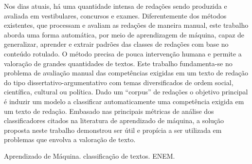 \begin{resumo} 
  Nos dias atuais, há uma quantidade intensa de redações sendo produzida e 
  avaliada em vestibulares, concursos e exames. Diferentemente dos métodos 
  existentes, que processam e avaliam as redações de maneira manual, este 
  trabalho aborda uma forma automática, por meio de  aprendizagem de máquina, 
  capaz de generalizar, aprender e extrair padrões das classes de redações com 
  base no conteúdo rotulado. O método precisa de pouca intervenção humana e 
  permite a valoração de grandes quantidades de textos.  Este trabalho 
  fundamenta-se no problema de avaliação manual das competências exigidas em um 
  texto de redação do tipo dissertativo-argumentativo com temas diversificados 
  de ordem social, científica, cultural ou política. Dado um ``corpus'' de 
  redações o objetivo principal é induzir um modelo a classificar 
  automaticamente uma competência exigida em um texto de redação. Embasado 
  nas principais métricas de análise dos classificadores citados na literatura 
  de aprendizado de máquina, a solução proposta neste trabalho demonstrou ser 
  útil e propícia a ser utilizada em problemas que envolva a valoração de texto.
\end{resumo}

\begin{palavrachave}
 Aprendizado de Máquina. classificação de textos. ENEM.
\end{palavrachave}